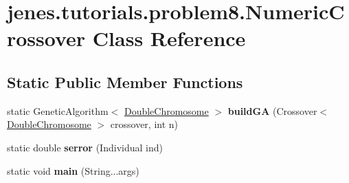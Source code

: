 \hypertarget{classjenes_1_1tutorials_1_1problem8_1_1_numeric_crossover}{
\section{jenes.tutorials.problem8.NumericCrossover Class Reference}
\label{classjenes_1_1tutorials_1_1problem8_1_1_numeric_crossover}
}
\subsection*{Static Public Member Functions}
\begin{CompactItemize}
\item 
\hypertarget{classjenes_1_1tutorials_1_1problem8_1_1_numeric_crossover_8af3f285354dc96e81647a03d76d93c5}{
static GeneticAlgorithm$<$ \hyperlink{classjenes_1_1chromosome_1_1_double_chromosome}{DoubleChromosome} $>$ \textbf{buildGA} (Crossover$<$ \hyperlink{classjenes_1_1chromosome_1_1_double_chromosome}{DoubleChromosome} $>$ crossover, int n)}
\label{classjenes_1_1tutorials_1_1problem8_1_1_numeric_crossover_8af3f285354dc96e81647a03d76d93c5}

\item 
\hypertarget{classjenes_1_1tutorials_1_1problem8_1_1_numeric_crossover_ef1de8d283010a790fb20661fae423f2}{
static double \textbf{serror} (Individual ind)}
\label{classjenes_1_1tutorials_1_1problem8_1_1_numeric_crossover_ef1de8d283010a790fb20661fae423f2}

\item 
\hypertarget{classjenes_1_1tutorials_1_1problem8_1_1_numeric_crossover_11da9d09414921591a53cddb601cc203}{
static void \textbf{main} (String...args)}
\label{classjenes_1_1tutorials_1_1problem8_1_1_numeric_crossover_11da9d09414921591a53cddb601cc203}

\end{CompactItemize}
